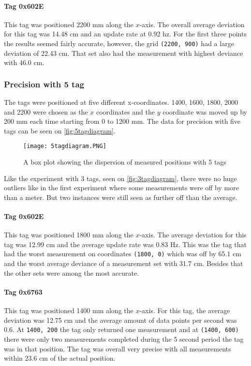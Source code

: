 \paragraph{Tag 0x602E}
This tag was positioned 2200 mm along the $x$-axis.
The overall average deviation for this tag was 14.48 cm and an update rate at 0.92 hz.
For the first three points the results seemed fairly accurate, however, the grid \texttt{(2200, 900)} had a large deviation of 22.43 cm.
That set also had the measurement with highest deviance with 46.0 cm.

\subsubsection{Precision with 5 tag}
The tags were positioned at five different x-coordinates.
1400, 1600, 1800, 2000 and 2200 were chosen as the $x$ coordinates and the $y$ coordinate was moved up by 200 mm each time starting from 0 to 1200 mm.
The data for precision with five tags can be seen on \autoref{fig:5tagdiagram}.
\begin{figure}[H]
    \centering
    \texttt{[image: 5tagdiagram.PNG]}
    \caption{A box plot showing the dispersion of measured positions with 5 tags}
    \label{fig:5tagdiagram}
\end{figure}
\noindent
Like the experiment with 3 tags, seen on \autoref{fig:3tagdiagram}, there were no huge outliers like in the first experiment where some measurements were off by more than a meter.
But two instances were still seen as further off than the average.


\paragraph{Tag 0x602E}
This tag was positioned 1800 mm along the $x$-axis.
The average deviation for this tag was 12.99 cm and the average update rate was 0.83 Hz.
This was the tag that had the worst measurement on coordinates \texttt{(1800, 0)} which was off by 65.1 cm and the worst average deviance of a measurement set with 31.7 cm.
Besides that the other sets were among the most accurate.

\paragraph{Tag 0x6763}
This tag was positioned 1400 mm along the $x$-axis.
For this tag, the average deviation was 12.75 cm and the average amount of data points per second was 0.6.
At \texttt{1400, 200} the tag only returned one measurement and at \texttt{(1400, 600)} there were only two measurements completed during the 5 second period the tag was in that position.
The tag was overall very precise with all measurements within 23.6 cm of the actual position.

